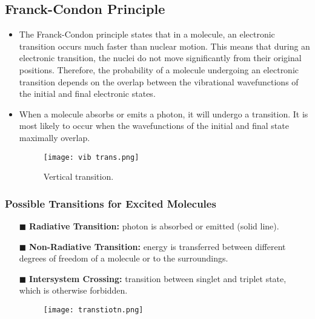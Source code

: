 \documentclass[12pt, letterpaper, twoside]{article}
\begin{document}
\subsection{Franck-Condon Principle}
\begin{itemize}
    \item The Franck-Condon principle states that in a molecule, an electronic transition occurs much faster than nuclear motion. This means that during an electronic transition, the nuclei do not move significantly from their original positions. Therefore, the probability of a molecule undergoing an electronic transition depends on the overlap between the vibrational wavefunctions of the initial and final electronic states.
    \item When a molecule absorbs or emits a photon, it will undergo a transition. It is most likely to occur when the wavefunctions of the initial and final state maximally overlap.
    \begin{figure}[!ht]
        \centering
        \texttt{[image: vib trans.png]}
        \caption{Vertical transition.}
    \end{figure}
\end{itemize}
\subsubsection{Possible Transitions for Excited Molecules}
\begin{itemize}
    \item[$\blacksquare$] \textbf{Radiative Transition:} photon is absorbed or emitted (solid line).
    \item[$\blacksquare$] \textbf{Non-Radiative Transition:} energy is transferred between different degrees of freedom of a molecule or to the surroundings.
    \item[$\blacksquare$] \textbf{Intersystem Crossing:} transition between singlet and triplet state, which is otherwise forbidden.
    \begin{figure}[!ht]
        \centering
        \texttt{[image: transtiotn.png]}
    \end{figure}
\end{itemize}

\noalign\hline
\end{document}
